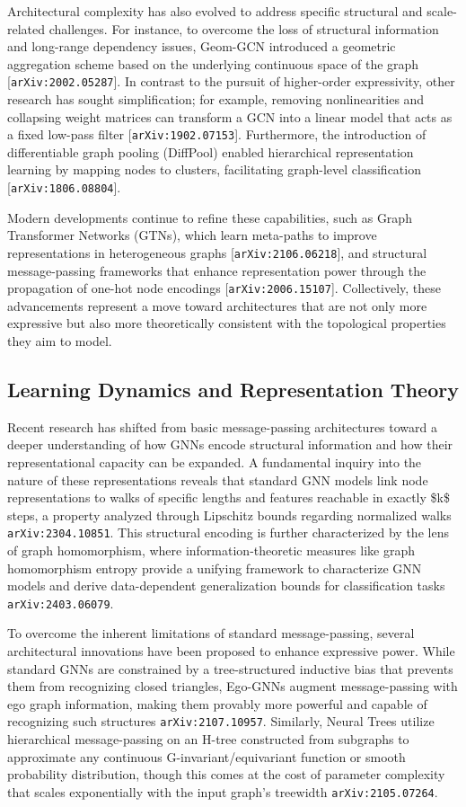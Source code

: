 \documentclass[11pt]{article}
\begin{document}
Architectural complexity has also evolved to address specific structural and scale-related challenges. For instance, to overcome the loss of structural information and long-range dependency issues, Geom-GCN introduced a geometric aggregation scheme based on the underlying continuous space of the graph [\texttt{arXiv:2002.05287}]. In contrast to the pursuit of higher-order expressivity, other research has sought simplification; for example, removing nonlinearities and collapsing weight matrices can transform a GCN into a linear model that acts as a fixed low-pass filter [\texttt{arXiv:1902.07153}]. Furthermore, the introduction of differentiable graph pooling (DiffPool) enabled hierarchical representation learning by mapping nodes to clusters, facilitating graph-level classification [\texttt{arXiv:1806.08804}].

Modern developments continue to refine these capabilities, such as Graph Transformer Networks (GTNs), which learn meta-paths to improve representations in heterogeneous graphs [\texttt{arXiv:2106.06218}], and structural message-passing frameworks that enhance representation power through the propagation of one-hot node encodings [\texttt{arXiv:2006.15107}]. Collectively, these advancements represent a move toward architectures that are not only more expressive but also more theoretically consistent with the topological properties they aim to model.

\subsection{Learning Dynamics and Representation Theory}

Recent research has shifted from basic message-passing architectures toward a deeper understanding of how GNNs encode structural information and how their representational capacity can be expanded. A fundamental inquiry into the nature of these representations reveals that standard GNN models link node representations to walks of specific lengths and features reachable in exactly \$k\$ steps, a property analyzed through Lipschitz bounds regarding normalized walks \texttt{arXiv:2304.10851}. This structural encoding is further characterized by the lens of graph homomorphism, where information-theoretic measures like graph homomorphism entropy provide a unifying framework to characterize GNN models and derive data-dependent generalization bounds for classification tasks \texttt{arXiv:2403.06079}.

To overcome the inherent limitations of standard message-passing, several architectural innovations have been proposed to enhance expressive power. While standard GNNs are constrained by a tree-structured inductive bias that prevents them from recognizing closed triangles, Ego-GNNs augment message-passing with ego graph information, making them provably more powerful and capable of recognizing such structures \texttt{arXiv:2107.10957}. Similarly, Neural Trees utilize hierarchical message-passing on an H-tree constructed from subgraphs to approximate any continuous G-invariant/equivariant function or smooth probability distribution, though this comes at the cost of parameter complexity that scales exponentially with the input graph's treewidth \texttt{arXiv:2105.07264}.
\end{document}
